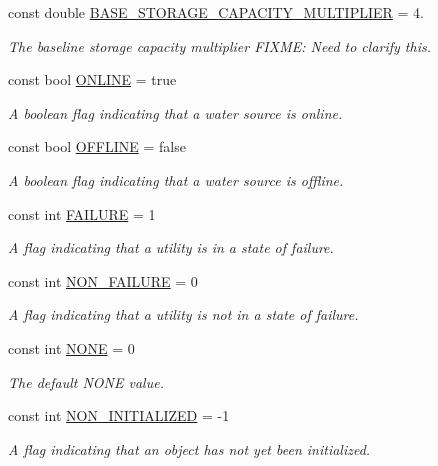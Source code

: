 \begin{DoxyCompactItemize}
const double \mbox{\hyperlink{classConstants_a057a0def6be60913ea568f5aa9d05ef2}{B\+A\+S\+E\+\_\+\+S\+T\+O\+R\+A\+G\+E\+\_\+\+C\+A\+P\+A\+C\+I\+T\+Y\+\_\+\+M\+U\+L\+T\+I\+P\+L\+I\+ER}} = 4.
\begin{DoxyCompactList}\small\item\em The baseline storage capacity multiplier F\+I\+X\+ME\+: Need to clarify this. \end{DoxyCompactList}\item 
const bool \mbox{\hyperlink{classConstants_a478993fe9b060f100867f2645bdc0baa}{O\+N\+L\+I\+NE}} = true
\begin{DoxyCompactList}\small\item\em A boolean flag indicating that a water source is online. \end{DoxyCompactList}\item 
const bool \mbox{\hyperlink{classConstants_a1e15aca4aeb3be807e35675fc09af563}{O\+F\+F\+L\+I\+NE}} = false
\begin{DoxyCompactList}\small\item\em A boolean flag indicating that a water source is offline. \end{DoxyCompactList}\item 
const int \mbox{\hyperlink{classConstants_ad5c946a1cf9d445d7753d3f30a39bf6e}{F\+A\+I\+L\+U\+RE}} = 1
\begin{DoxyCompactList}\small\item\em A flag indicating that a utility is in a state of failure. \end{DoxyCompactList}\item 
const int \mbox{\hyperlink{classConstants_a0595423b130c1645b173272f50338ed9}{N\+O\+N\+\_\+\+F\+A\+I\+L\+U\+RE}} = 0
\begin{DoxyCompactList}\small\item\em A flag indicating that a utility is not in a state of failure. \end{DoxyCompactList}\item 
const int \mbox{\hyperlink{classConstants_a79ee092c4ca31cde9669f70d505eeca5}{N\+O\+NE}} = 0
\begin{DoxyCompactList}\small\item\em The default {\ttfamily N\+O\+NE} value. \end{DoxyCompactList}\item 
const int \mbox{\hyperlink{classConstants_a8e8b0a537619c378d03117c5ed1c3ea1}{N\+O\+N\+\_\+\+I\+N\+I\+T\+I\+A\+L\+I\+Z\+ED}} = -\/1
\begin{DoxyCompactList}\small\item\em A flag indicating that an object has not yet been initialized. \end{DoxyCompactList}\item 

\end{DoxyCompactItemize}
